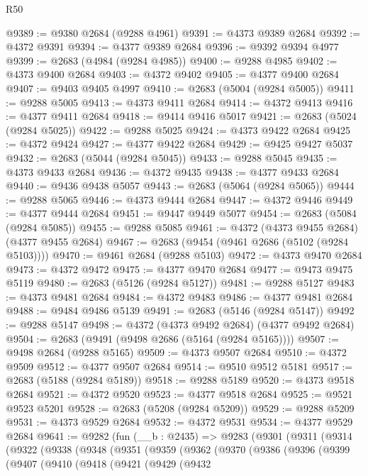 \begin{lexlean}{R50}
\begin{coremodule}
@9389 := @9380 @2684 (@9288 @4961)
@9391 := @4373 @9389 @2684
@9392 := @4372 @9391
@9394 := @4377 @9389 @2684
@9396 := @9392 @9394 @4977
@9399 := @2683 (@4984 (@9284 @4985))
@9400 := @9288 @4985
@9402 := @4373 @9400 @2684
@9403 := @4372 @9402
@9405 := @4377 @9400 @2684
@9407 := @9403 @9405 @4997
@9410 := @2683 (@5004 (@9284 @5005))
@9411 := @9288 @5005
@9413 := @4373 @9411 @2684
@9414 := @4372 @9413
@9416 := @4377 @9411 @2684
@9418 := @9414 @9416 @5017
@9421 := @2683 (@5024 (@9284 @5025))
@9422 := @9288 @5025
@9424 := @4373 @9422 @2684
@9425 := @4372 @9424
@9427 := @4377 @9422 @2684
@9429 := @9425 @9427 @5037
@9432 := @2683 (@5044 (@9284 @5045))
@9433 := @9288 @5045
@9435 := @4373 @9433 @2684
@9436 := @4372 @9435
@9438 := @4377 @9433 @2684
@9440 := @9436 @9438 @5057
@9443 := @2683 (@5064 (@9284 @5065))
@9444 := @9288 @5065
@9446 := @4373 @9444 @2684
@9447 := @4372 @9446
@9449 := @4377 @9444 @2684
@9451 := @9447 @9449 @5077
@9454 := @2683 (@5084 (@9284 @5085))
@9455 := @9288 @5085
@9461 := @4372 (@4373 @9455 @2684) (@4377 @9455 @2684)
@9467 := @2683 (@9454 (@9461 @2686 (@5102 (@9284 @5103))))
@9470 := @9461 @2684 (@9288 @5103)
@9472 := @4373 @9470 @2684
@9473 := @4372 @9472
@9475 := @4377 @9470 @2684
@9477 := @9473 @9475 @5119
@9480 := @2683 (@5126 (@9284 @5127))
@9481 := @9288 @5127
@9483 := @4373 @9481 @2684
@9484 := @4372 @9483
@9486 := @4377 @9481 @2684
@9488 := @9484 @9486 @5139
@9491 := @2683 (@5146 (@9284 @5147))
@9492 := @9288 @5147
@9498 := @4372 (@4373 @9492 @2684) (@4377 @9492 @2684)
@9504 := @2683 (@9491 (@9498 @2686 (@5164 (@9284 @5165))))
@9507 := @9498 @2684 (@9288 @5165)
@9509 := @4373 @9507 @2684
@9510 := @4372 @9509
@9512 := @4377 @9507 @2684
@9514 := @9510 @9512 @5181
@9517 := @2683 (@5188 (@9284 @5189))
@9518 := @9288 @5189
@9520 := @4373 @9518 @2684
@9521 := @4372 @9520
@9523 := @4377 @9518 @2684
@9525 := @9521 @9523 @5201
@9528 := @2683 (@5208 (@9284 @5209))
@9529 := @9288 @5209
@9531 := @4373 @9529 @2684
@9532 := @4372 @9531
@9534 := @4377 @9529 @2684
@9641 := @9282
    (fun (__b : @2435) =>
    @9283
      (@9301
        (@9311
          (@9314
            (@9322
              (@9338
                (@9348
                  (@9351
                    (@9359
                      (@9362
                        (@9370
                          (@9386
                            (@9396
                              (@9399
                                (@9407
                                  (@9410
                                    (@9418
                                      (@9421
                                        (@9429
                                          (@9432

\end{coremodule}
\end{lexlean}
